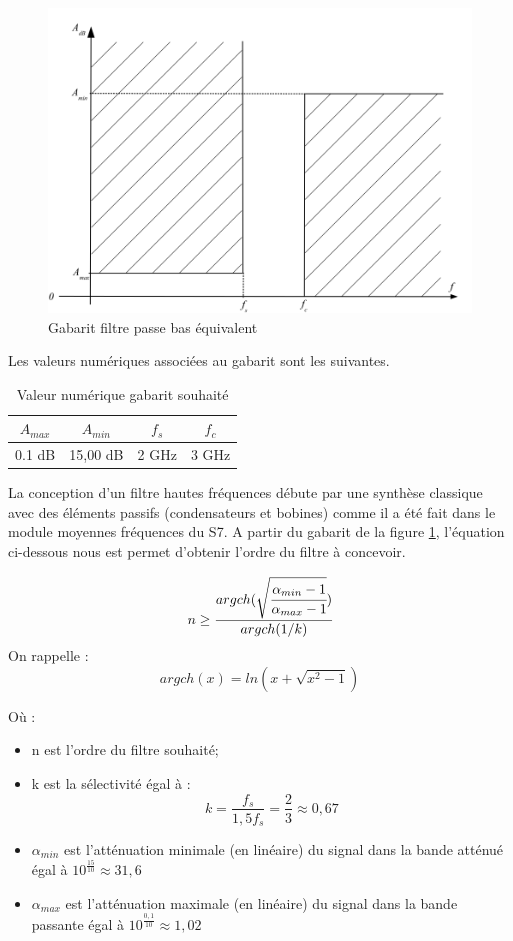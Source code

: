 \documentclass[french]{article}
\begin{document}
\begin{figure}[H]
	\centering
	\includegraphics[width=0.5\linewidth]{ressources/gabarit_passe_bas}
	\caption{Gabarit filtre passe bas équivalent}
	\label{fig:gabarit_PasseBas}
\end{figure}

Les valeurs numériques associées au gabarit sont les suivantes.
\begin{table}[H]
	\centering
	\begin{tabular}{|c|c|c|c|}
		\hline
		$A_{max}$& $A_{min}$ & $f_s$ & $f_c$ \\ \hline
		0.1	dB & 15,00 dB 		& 2 GHz	   & 3 GHz \\ \hline
	\end{tabular}
	\caption{Valeur numérique gabarit souhaité}
\end{table}
La conception d'un filtre hautes fréquences débute par une synthèse classique avec des éléments passifs (condensateurs et bobines) comme il a été fait dans le module moyennes fréquences du S7. A partir du gabarit de la figure \ref{fig:gabarit_PasseBas}, l'équation ci-dessous nous est permet d'obtenir l'ordre du filtre à concevoir.


\begin{equation}
	n \geq \cfrac{argch(\sqrt{\cfrac{\alpha_{min}-1}{\alpha_{max} -1}})}{argch(1/k)}
\end{equation}
On rappelle :
\begin{equation}
argch(x)=ln(x+\sqrt{x^2-1})
\end{equation}

Où :
\begin{itemize}
	\item n est l'ordre du filtre souhaité;
		\item k est la sélectivité égal à : 
	\begin{equation}
	k=\frac{f_s}{1,5f_s} = \frac{2}{3} \approx 0,67
	\end{equation}
	\item $\alpha_{min}$ est l'atténuation minimale (en linéaire) du signal dans la bande atténué égal à $10^{\frac{15}{10}} \approx 31,6$
	\item $\alpha_{max}$ est l'atténuation maximale (en linéaire) du signal dans la bande passante égal à $10^{\frac{0,1}{10}} \approx 1,02$
\end{itemize}
\end{document}
